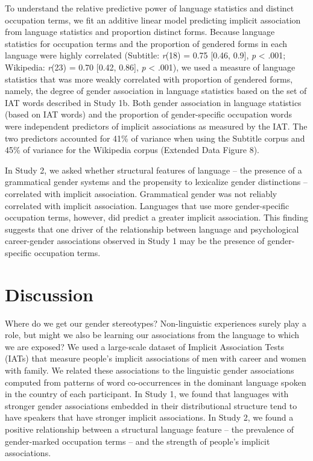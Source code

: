 \documentclass[11pt]{wlscirep}
\begin{document}
To understand the relative predictive power of language statistics and
distinct occupation terms, we fit an additive linear model predicting implicit association
from language statistics and proportion distinct forms. Because language statistics for occupation terms and
the proportion of gendered forms in each language were highly correlated (Subtitle: \emph{r}(18)  = 0.75 {[}0.46, 0.9{]}, \emph{p}
\textless{} .001; Wikipedia: \emph{r}(23) =
0.70  {[}0.42, 0.86{]}, \emph{p} \textless{} .001), we used a measure of language statistics that was more weakly correlated with proportion of gendered forms, namely, the degree of gender association in language statistics
based on the set of IAT words described in Study 1b. Both
gender association in language statistics (based on IAT words) and the
proportion of gender-specific occupation words were independent
predictors of implicit associations as measured by the IAT. The two predictors accounted for 41\% of
variance when using the Subtitle corpus and 45\% of
variance for the Wikipedia corpus (Extended Data Figure 8).

In Study 2, we asked whether structural features of language -- the
presence of a grammatical gender systems and the propensity to
lexicalize gender distinctions -- correlated with implicit association.
Grammatical gender was not reliably correlated with implicit association.
Languages that use more gender-specific occupation terms, however, did
predict a greater implicit association. This finding suggests that one driver of the relationship between language and psychological career-gender associations observed in Study 1 may be the presence of gender-specific occupation terms.

\section*{Discussion}\label{general-discussion}

Where do we get our gender stereotypes? Non-linguistic experiences surely play a role, but might we also be learning our associations from the language to which we are exposed? We used a large-scale dataset of Implicit Association Tests (IATs) that measure people's implicit associations of men with career and women with family. We related these associations to the linguistic gender associations computed from patterns of word co-occurrences in the dominant language spoken in the country of each participant. In Study 1, we found that languages with stronger gender associations embedded in their distributional structure tend to have speakers that have stronger implicit associations. In Study 2, we found a positive relationship between a structural language feature – the prevalence of gender-marked occupation terms – and the strength of people's implicit associations.
\end{document}
